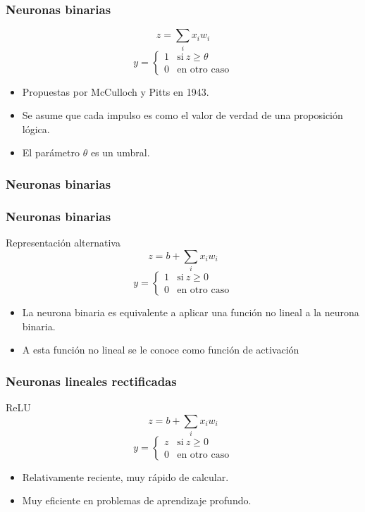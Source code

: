 \documentclass{beamer}
\begin{document}
\begin{frame}
  \frametitle{Neuronas binarias}
  \begin{block}{}
      $$ z = \sum_{i} x_i w_i $$
      $$ y = \left\{
          \begin{array}{ll}
            1 & \text{si}\ z \ge \theta \\
            0 & \text{en otro caso}
          \end{array} \right. $$
  \end{block}

  \begin{itemize}
  \item Propuestas por McCulloch y Pitts en 1943.
  \item Se asume que cada impulso es como el valor de verdad de una
    proposición lógica.
  \item El parámetro $\theta$ es un umbral.
  \end{itemize}
\end{frame}

\begin{frame}
  \frametitle{Neuronas binarias}

  \frametitle{Neuronas binarias}
  \begin{block}{Representación alternativa}
      $$ z = b + \sum_{i} x_i w_i $$
      $$ y = \left\{
          \begin{array}{ll}
            1 & \text{si}\ z \ge 0 \\
            0 & \text{en otro caso}
          \end{array} \right. $$
  \end{block}

  \begin{itemize}
  \item La neurona binaria es equivalente a aplicar una función no
    lineal a la neurona binaria.
  \item A esta función no lineal se le conoce como \alert{función de activación}
  \end{itemize}
\end{frame}

\begin{frame}
 \frametitle{Neuronas lineales rectificadas}
  \begin{block}{ReLU}
      $$ z = b + \sum_{i} x_i w_i $$
      $$ y = \left\{
          \begin{array}{ll}
            z & \text{si}\ z \ge 0 \\
            0 & \text{en otro caso}
          \end{array} \right. $$
  \end{block}
  
  \begin{itemize}
  \item Relativamente reciente, muy rápido de calcular.
  \item Muy eficiente en problemas de aprendizaje profundo.
  \end{itemize}
\end{frame}
\end{document}

